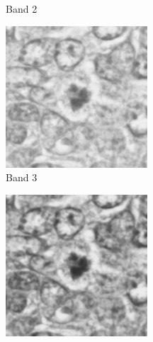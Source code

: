 \documentclass[10pt,twocolumn,letterpaper]{article}
\begin{document}
\begin{figure}[t]
\begin{subfigure}[b]{0.11\textwidth}
		\caption*{Band 2}
	\end{subfigure}
	\begin{subfigure}[b]{0.11\textwidth}
		\centering
		\includegraphics[width=\textwidth]{img/M03_00a_0308_m1.png}
		\caption*{Band 3}
	\end{subfigure}
	\begin{subfigure}[b]{0.11\textwidth}
		\centering
		\includegraphics[width=\textwidth]{img/M03_00a_0406_m1.png}

\end{subfigure}
\end{figure}
\end{document}
